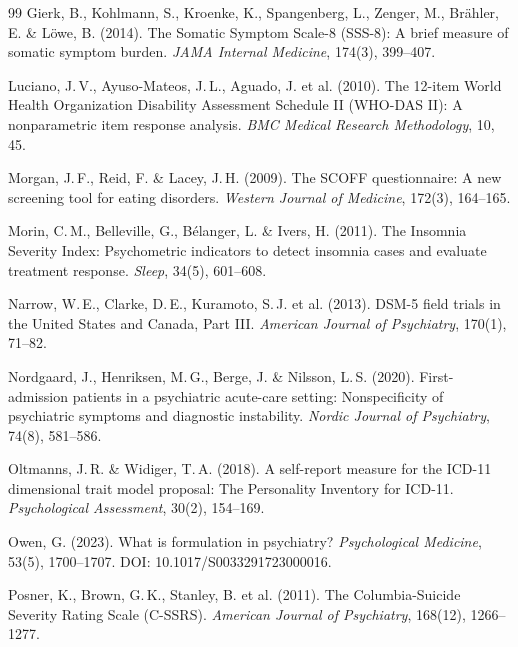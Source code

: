 \documentclass[11pt,a4paper]{article}
\begin{document}
\begin{thebibliography}{99}
Gierk, B., Kohlmann, S., Kroenke, K., Spangenberg, L., Zenger, M., Br\"ahler, E. \& L\"owe, B. (2014).
\newblock The Somatic Symptom Scale-8 (SSS-8): A brief measure of somatic symptom burden.
\newblock \textit{JAMA Internal Medicine}, 174(3), 399--407.

Luciano, J.\,V., Ayuso-Mateos, J.\,L., Aguado, J. et al. (2010).
\newblock The 12-item World Health Organization Disability Assessment Schedule II (WHO-DAS II): A nonparametric item response analysis.
\newblock \textit{BMC Medical Research Methodology}, 10, 45.

Morgan, J.\,F., Reid, F. \& Lacey, J.\,H. (2009).
\newblock The SCOFF questionnaire: A new screening tool for eating disorders.
\newblock \textit{Western Journal of Medicine}, 172(3), 164--165.

Morin, C.\,M., Belleville, G., B\'elanger, L. \& Ivers, H. (2011).
\newblock The Insomnia Severity Index: Psychometric indicators to detect insomnia cases and evaluate treatment response.
\newblock \textit{Sleep}, 34(5), 601--608.

Narrow, W.\,E., Clarke, D.\,E., Kuramoto, S.\,J. et al. (2013).
\newblock DSM-5 field trials in the United States and Canada, Part III.
\newblock \textit{American Journal of Psychiatry}, 170(1), 71--82.

Nordgaard, J., Henriksen, M.\,G., Berge, J. \& Nilsson, L.\,S. (2020).
\newblock First-admission patients in a psychiatric acute-care setting: Nonspecificity of psychiatric symptoms and diagnostic instability.
\newblock \textit{Nordic Journal of Psychiatry}, 74(8), 581--586.

Oltmanns, J.\,R. \& Widiger, T.\,A. (2018).
\newblock A self-report measure for the ICD-11 dimensional trait model proposal: The Personality Inventory for ICD-11.
\newblock \textit{Psychological Assessment}, 30(2), 154--169.

Owen, G. (2023).
\newblock What is formulation in psychiatry?
\newblock \textit{Psychological Medicine}, 53(5), 1700--1707. DOI: 10.1017/S0033291723000016.

Posner, K., Brown, G.\,K., Stanley, B. et al. (2011).
\newblock The Columbia-Suicide Severity Rating Scale (C-SSRS).
\newblock \textit{American Journal of Psychiatry}, 168(12), 1266--1277.


\end{thebibliography}
\end{document}

